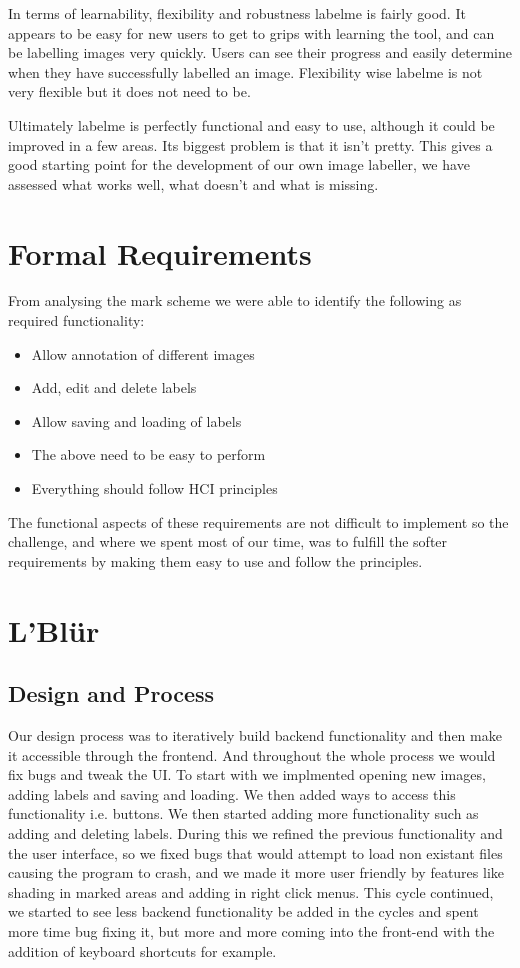 \documentclass[a4paper,11pt,oneside]{article}
\begin{document}
In terms of learnability, flexibility and robustness labelme is fairly good.  It appears to be easy for new users to get to grips with learning the tool, and can be labelling images very quickly.  Users can see their progress and easily determine when they have successfully labelled an image.  Flexibility wise labelme is not very flexible but it does not need to be.

Ultimately labelme is perfectly functional and easy to use, although it could be improved in a few areas.  Its biggest problem is that it isn't pretty.  This gives a good starting point for the development of our own image labeller, we have assessed what works well, what doesn't and what is missing.

\section{Formal Requirements}

From analysing the mark scheme we were able to identify the following as required functionality:
\begin{itemize}
\item Allow annotation of different images
\item Add, edit and delete labels
\item Allow saving and loading of labels
\item The above need to be easy to perform
\item Everything should follow HCI principles
\end{itemize}
The functional aspects of these requirements are not difficult to implement so the challenge, and where we spent most of our time, was to fulfill the softer requirements by making them easy to use and follow the principles.

\section{L'Bl\"{u}r}

\subsection{Design and Process}
Our design process was to iteratively build backend functionality and then make it accessible through the frontend.  And throughout the whole process we would fix bugs and tweak the UI.  To start with we implmented opening new images, adding labels and saving and loading.  We then added ways to access this functionality i.e. buttons.  We then started adding more functionality such as adding and deleting labels.  During this we refined the previous functionality and the user interface, so we fixed bugs that would attempt to load non existant files causing the program to crash, and we made it more user friendly by features like shading in marked areas and adding in right click menus.  This cycle continued, we started to see less backend functionality be added in the cycles and spent more time bug fixing it, but more and more coming into the front-end with the addition of keyboard shortcuts for example.
\end{document}
